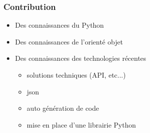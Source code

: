 \begin{frame}
    \frametitle{Contribution}
    \begin{itemize}
        \item Des connaissances du Python
        \item Des connaissances de l'orienté objet
        \item Des connaissances des technologies récentes
            \begin{itemize}
                \item solutions techniques (API, etc...)
                \item json
                \item auto génération de code
                \item mise en place d'une librairie Python
            \end{itemize}
    \end{itemize}
\end{frame}